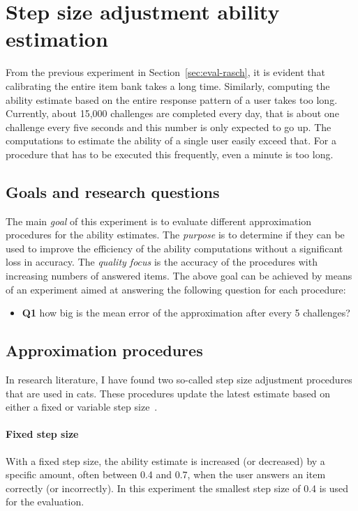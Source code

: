 \section{Step size adjustment ability estimation}
\label{sec:eval-stepsize}

From the previous experiment in Section~\ref{sec:eval-rasch}, it is evident that calibrating the entire item bank takes a long time.
Similarly, computing the ability estimate based on the entire response pattern of a user takes too long.
Currently, about 15,000 challenges are completed every day, that is about one challenge every five seconds and this number is only expected to go up.
The computations to estimate the ability of a single user easily exceed that.
For a procedure that has to be executed this frequently, even a minute is too long.

\subsection{Goals and research questions}
The main \textit{goal} of this experiment is to evaluate different approximation procedures for the ability estimates.
The \textit{purpose} is to determine if they can be used to improve the efficiency of the ability computations without a significant loss in accuracy.
The \textit{quality focus} is the accuracy of the procedures with increasing numbers of answered items.
The above goal can be achieved by means of an experiment aimed at answering the following question for each procedure:
\begin{itemize}
    \item \textbf{Q1} how big is the mean error of the approximation after every 5 challenges?
\end{itemize}

\subsection{Approximation procedures}
In research literature, I have found two so-called step size adjustment procedures that are used in \glspl{cat}.
These procedures update the latest estimate based on either a fixed or variable step size~\cite{dodd1995computerized}.

\paragraph{Fixed step size} With a fixed step size, the ability estimate is increased (or decreased) by a specific amount, often between 0.4 and 0.7, when the user answers an item correctly (or incorrectly).
In this experiment the smallest step size of 0.4 is used for the evaluation.

